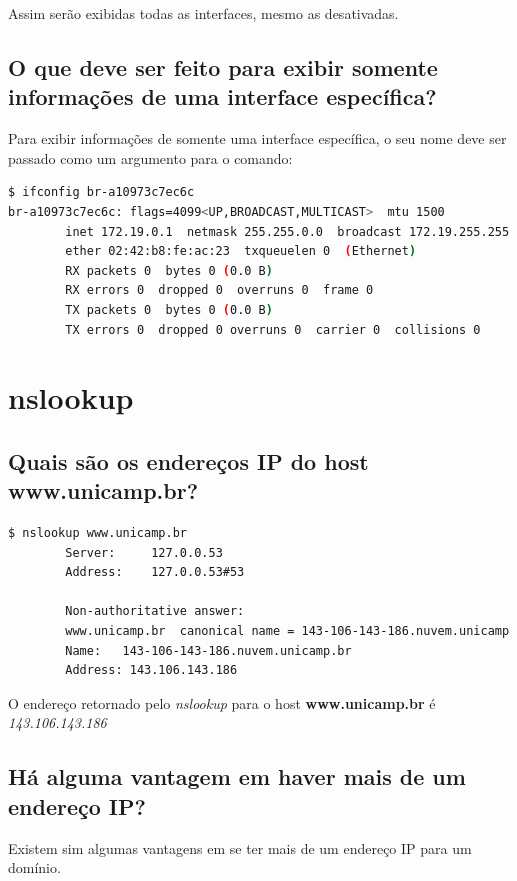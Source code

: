 \documentclass[12pt,a4paper]{report}
\begin{document}
\noindent Assim serão exibidas todas as interfaces, mesmo as desativadas.

\subsection{O que deve ser feito para exibir somente informações de uma interface específica?}

Para exibir informações de somente uma interface específica, o seu nome deve ser passado como um argumento para o comando:

\begin{lstlisting}[language=bash]
$ ifconfig br-a10973c7ec6c
br-a10973c7ec6c: flags=4099<UP,BROADCAST,MULTICAST>  mtu 1500
        inet 172.19.0.1  netmask 255.255.0.0  broadcast 172.19.255.255
        ether 02:42:b8:fe:ac:23  txqueuelen 0  (Ethernet)
        RX packets 0  bytes 0 (0.0 B)
        RX errors 0  dropped 0  overruns 0  frame 0
        TX packets 0  bytes 0 (0.0 B)
        TX errors 0  dropped 0 overruns 0  carrier 0  collisions 0
\end{lstlisting}

\section{nslookup}
\subsection{Quais são os endereços IP do host www.unicamp.br?}

\begin{lstlisting}[language=bash]
        $ nslookup www.unicamp.br
        Server:		127.0.0.53
        Address:	127.0.0.53#53

        Non-authoritative answer:
        www.unicamp.br	canonical name = 143-106-143-186.nuvem.unicamp.br.
        Name:	143-106-143-186.nuvem.unicamp.br
        Address: 143.106.143.186
\end{lstlisting}

O endereço retornado pelo \emph{nslookup} para o host \textbf{www.unicamp.br} é \emph{143.106.143.186}

\subsection{Há alguma vantagem em haver mais de um endereço IP?}

Existem sim algumas vantagens em se ter mais de um endereço IP para um domínio.
\end{document}
